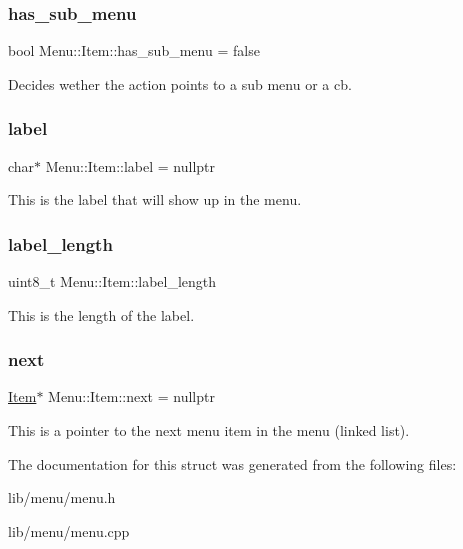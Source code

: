 \subsubsection{\texorpdfstring{has\+\_\+sub\+\_\+menu}{has\_sub\_menu}}
{\footnotesize\ttfamily bool Menu\+::\+Item\+::has\+\_\+sub\+\_\+menu = false}

Decides wether the action points to a sub menu or a cb. \hypertarget{struct_menu_1_1_item_a378723382fc64c752a85ffe6fec9707e}{}\label{struct_menu_1_1_item_a378723382fc64c752a85ffe6fec9707e} 
\subsubsection{\texorpdfstring{label}{label}}
{\footnotesize\ttfamily char$\ast$ Menu\+::\+Item\+::label = nullptr}

This is the label that will show up in the menu. \hypertarget{struct_menu_1_1_item_a46749d046bbbde8d5308848d5394c2dc}{}\label{struct_menu_1_1_item_a46749d046bbbde8d5308848d5394c2dc} 
\subsubsection{\texorpdfstring{label\+\_\+length}{label\_length}}
{\footnotesize\ttfamily uint8\+\_\+t Menu\+::\+Item\+::label\+\_\+length}

This is the length of the label. \hypertarget{struct_menu_1_1_item_aadcc1e4e824296c6b72ac7d053f06869}{}\label{struct_menu_1_1_item_aadcc1e4e824296c6b72ac7d053f06869} 
\subsubsection{\texorpdfstring{next}{next}}
{\footnotesize\ttfamily \hyperlink{struct_menu_1_1_item}{Item}$\ast$ Menu\+::\+Item\+::next = nullptr}

This is a pointer to the next menu item in the menu (linked list). 

The documentation for this struct was generated from the following files\+:\begin{DoxyCompactItemize}
\item 
lib/menu/menu.\+h\item 
lib/menu/menu.\+cpp\end{DoxyCompactItemize}
